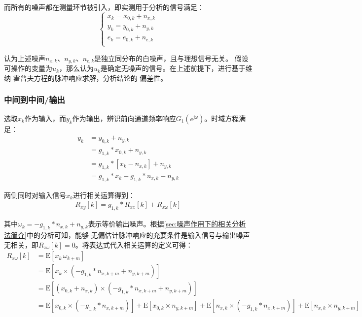 而所有的噪声都在测量环节被引入，即实测用于分析的信号满足：
\begin{equation*}
    \begin{cases}
        x_k=x_{0,k}+n_{x,k}\\
        y_k=y_{0,k}+n_{y,k}\\
        e_k=e_{0,k}+n_{e,k}\\
    \end{cases}
\end{equation*}

认为上述噪声\(n_{x,k}\)、\(n_{y,k}\)、\(n_{e,k}\)是独立同分布的白噪声，且与理想信号无关。
假设可操作的变量为\(u_k\)，那么认为\(u_k\)是确定无噪声的信号。在上述前提下，进行基于维纳-霍普夫方程的脉冲响应求解，分析结论的
偏差性。

\subsubsection{中间到中间/输出}
选取\(x_k\)作为输入，而\(y_k\)作为输出，辨识前向通道频率响应\(G_1(e^{\mathrm{j}\omega})\)。时域方程满足：
\begin{align*}
    y_k&=y_{0,k}+n_{y,k}\\
    &=g_{1,k}*x_{0,k}+n_{y,k}\\
    &=g_{1,k}*[x_k-n_{x,k}]+n_{y,k}\\
    &=g_{1,k}*x_k-g_{1,k}*n_{x,k}+n_{y,k}
\end{align*}

两侧同时对输入信号\(x_k\)进行相关运算得到：
\begin{align*}
    R_{xy}[k] = g_{1,k}*R_{xx}[k]+R_{x\omega}[k]
\end{align*}

其中\(\omega_k = -g_{1,k}*n_{x,k}+n_{y,k}\)表示等价输出噪声。根据\ref{sec:噪声作用下的相关分析法简介}中的分析可知，能够
无偏估计脉冲响应的充要条件是输入信号与输出噪声无相关，即\(R_{x\omega}[k]=0\)。将表达式代入相关运算的定义可得：
\begin{align*}
    R_{x\omega}[k] &= \text{E}[x_k\,\omega_{k+m}]\\
    &= \text{E}[x_k\times(-g_{1,k}*n_{x,k+m}+n_{y,k+m})]\\
    &= \text{E}[(x_{0,k}+n_{x,k})\times(-g_{1,k}*n_{x,k+m}+n_{y,k+m})]\\
    &= \text{E}[x_{0,k}\times(-g_{1,k}*n_{x,k+m})]+\text{E}[x_{0,k}\times n_{y,k+m}]
    + \text{E}[n_{x,k}\times(-g_{1,k}*n_{x,k+m})]+\text{E}[n_{x,k}\times n_{y,k+m}]
\end{align*}

